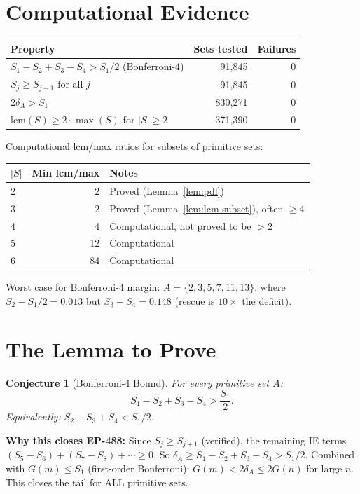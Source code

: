 \documentclass[11pt,a4paper]{article}
\newtheorem{conjecture}[theorem]{Conjecture}
\theoremstyle{definition}
\begin{document}
\section{Computational Evidence}

\begin{center}
\begin{tabular}{lrr}
\toprule
\textbf{Property} & \textbf{Sets tested} & \textbf{Failures} \\
\midrule
$S_1 - S_2 + S_3 - S_4 > S_1/2$ (Bonferroni-4) & 91,845 & 0 \\
$S_j \geq S_{j+1}$ for all $j$ & 91,845 & 0 \\
$2\delta_A > S_1$ & 830,271 & 0 \\
$\mathrm{lcm}(S) \geq 2 \cdot \max(S)$ for $|S| \geq 2$ & 371,390 & 0 \\
\bottomrule
\end{tabular}
\end{center}

Computational lcm/max ratios for subsets of primitive sets:
\begin{center}
\begin{tabular}{lrl}
\toprule
$|S|$ & Min lcm/max & Notes \\
\midrule
2 & 2 & Proved (Lemma~\ref{lem:pdl}) \\
3 & 2 & Proved (Lemma~\ref{lem:lcm-subset}), often $\geq 4$ \\
4 & 4 & Computational, not proved to be $> 2$ \\
5 & 12 & Computational \\
6 & 84 & Computational \\
\bottomrule
\end{tabular}
\end{center}

Worst case for Bonferroni-4 margin: $A = \{2,3,5,7,11,13\}$,
where $S_2 - S_1/2 = 0.013$ but $S_3 - S_4 = 0.148$ (rescue is $10\times$
the deficit).

\section{The Lemma to Prove}

\begin{conjecture}[Bonferroni-4 Bound]\label{conj:bonf4}
For every primitive set $A$:
\[
S_1 - S_2 + S_3 - S_4 > \frac{S_1}{2}.
\]
Equivalently: $S_2 - S_3 + S_4 < S_1/2$.
\end{conjecture}

\textbf{Why this closes EP-488:} Since $S_j \geq S_{j+1}$ (verified),
the remaining IE terms $(S_5 - S_6) + (S_7 - S_8) + \cdots \geq 0$.
So $\delta_A \geq S_1 - S_2 + S_3 - S_4 > S_1/2$. Combined with
$G(m) \leq S_1$ (first-order Bonferroni): $G(m) < 2\delta_A \leq 2G(n)$
for large $n$. This closes the tail for ALL primitive sets.
\end{document}
